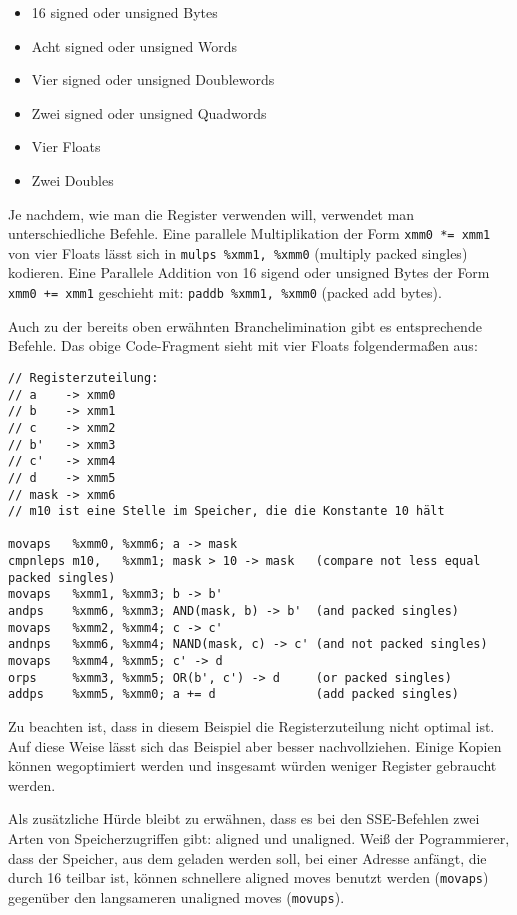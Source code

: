 \documentclass[a4paper,10pt]{article}
\begin{document}
\begin{itemize}
    \item 16 signed oder unsigned Bytes
    \item Acht signed oder unsigned Words
    \item Vier signed oder unsigned Doublewords
    \item Zwei signed oder unsigned Quadwords
    \item Vier Floats
    \item Zwei Doubles
\end{itemize}

Je nachdem, wie man die Register verwenden will, verwendet man unterschiedliche Befehle. Eine
parallele Multiplikation der Form \texttt{xmm0 *= xmm1} von vier Floats lässt sich in \texttt{mulps
\%xmm1, \%xmm0} (multiply packed singles) kodieren. Eine Parallele Addition von 16 sigend oder
unsigned Bytes der Form \texttt{xmm0 += xmm1} geschieht mit: \texttt{paddb \%xmm1, \%xmm0} (packed
add bytes). 

Auch zu der bereits oben erwähnten Branchelimination gibt es entsprechende Befehle. Das obige
Code-Fragment sieht mit vier Floats folgendermaßen aus:

\begin{verbatim}
// Registerzuteilung:
// a    -> xmm0
// b    -> xmm1
// c    -> xmm2
// b'   -> xmm3
// c'   -> xmm4
// d    -> xmm5
// mask -> xmm6
// m10 ist eine Stelle im Speicher, die die Konstante 10 hält

movaps   %xmm0, %xmm6; a -> mask
cmpnleps m10,   %xmm1; mask > 10 -> mask   (compare not less equal packed singles)
movaps   %xmm1, %xmm3; b -> b'
andps    %xmm6, %xmm3; AND(mask, b) -> b'  (and packed singles) 
movaps   %xmm2, %xmm4; c -> c'
andnps   %xmm6, %xmm4; NAND(mask, c) -> c' (and not packed singles)
movaps   %xmm4, %xmm5; c' -> d
orps     %xmm3, %xmm5; OR(b', c') -> d     (or packed singles)
addps    %xmm5, %xmm0; a += d              (add packed singles)
\end{verbatim}

Zu beachten ist, dass in diesem Beispiel die Registerzuteilung nicht optimal ist. Auf diese Weise
lässt sich das Beispiel aber besser nachvollziehen. Einige Kopien können wegoptimiert werden
und insgesamt würden weniger Register gebraucht werden.

Als zusätzliche Hürde bleibt zu erwähnen, dass es bei den SSE-Befehlen zwei Arten von
Speicherzugriffen gibt: aligned und unaligned. Weiß der Pogrammierer, dass der Speicher, aus dem
geladen werden soll, bei einer Adresse anfängt, die durch 16 teilbar ist, können schnellere aligned
moves benutzt werden (\texttt{movaps}) gegenüber den langsameren unaligned moves (\texttt{movups}).
\end{document}
